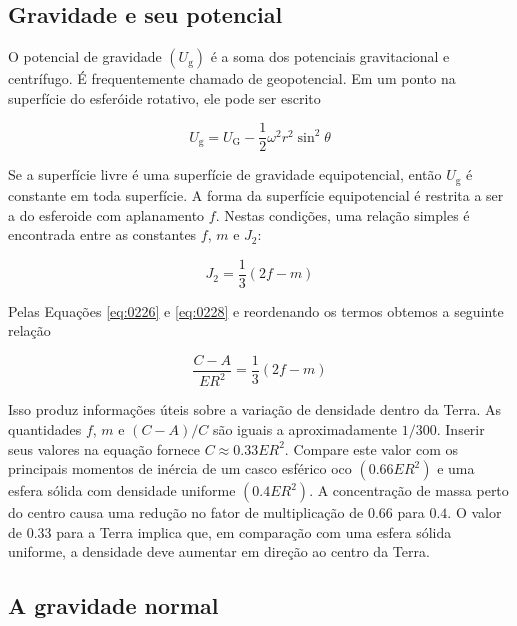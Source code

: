 \documentclass[]{book}
\theoremstyle{definition}
\theoremstyle{definition}
\theoremstyle{definition}
\theoremstyle{remark}
\begin{document}
\hypertarget{gravidade-e-seu-potencial}{%
\subsection{Gravidade e seu potencial}\label{gravidade-e-seu-potencial}}

O potencial de gravidade \((U_\mathrm{g})\) é a soma dos potenciais gravitacional e centrífugo. É frequentemente chamado de geopotencial. Em um ponto na superfície do esferóide rotativo, ele pode ser escrito

\begin{equation}
U_{\mathrm{g}}=U_{\mathrm{G}}-\frac{1}{2} \omega^{2} r^{2} \sin ^{2} \theta \label{eq:0227}
\end{equation}

Se a superfície livre é uma superfície de gravidade equipotencial, então \(U_\mathrm{g}\) é constante em toda superfície. A forma da superfície equipotencial é restrita a ser a do esferoide com aplanamento \(f\). Nestas condições, uma relação simples é encontrada entre as constantes \(f\), \(m\) e \(J_2\):

\begin{equation}
J_{2}=\frac{1}{3}(2 f-m) \label{eq:0228}
\end{equation}

Pelas Equações \eqref{eq:0226} e \eqref{eq:0228} e reordenando os termos obtemos a seguinte relação

\begin{equation}
\frac{C-A}{E R^{2}}=\frac{1}{3}(2 f-m) \label{eq:0229}
\end{equation}

Isso produz informações úteis sobre a variação de densidade dentro da Terra. As quantidades \(f\), \(m\) e \((C-A)/C\) são iguais a aproximadamente \(1/300\). Inserir seus valores na equação fornece \(C \approx 0.33ER^2\). Compare este valor com os principais momentos de inércia de um casco esférico oco \((0.66ER^2)\) e uma esfera sólida com densidade uniforme \((0.4ER^2)\). A concentração de massa perto do centro causa uma redução no fator de multiplicação de \(0.66\) para \(0.4\). O valor de \(0.33\) para a Terra implica que, em comparação com uma esfera sólida uniforme, a densidade deve aumentar em direção ao centro da Terra.

\hypertarget{a-gravidade-normal}{%
\subsection{A gravidade normal}\label{a-gravidade-normal}}
\end{document}
